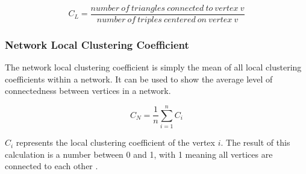 \begin{equation}
C_L = \frac{number\: of\: triangles\: connected\: to\: vertex\: v}{number\: of\: triples\: centered\: on\: vertex\: v}
\label{eq:localcc}
\end{equation}

\subsubsection{Network Local Clustering Coefficient}
The network local clustering coefficient is simply the mean of all local clustering coefficients within a network. It can be used to show the average level of connectedness between vertices in a network.

\begin{equation}
C_N = \frac{1}{n}\sum_{i=1}^{n} C_i
\label{eq:networkcc}
\end{equation}

$C_i$ represents the local clustering coefficient of the vertex $i$. The result of this calculation is a number between 0 and 1, with 1 meaning all vertices are connected to each other \cite{watts98}.
